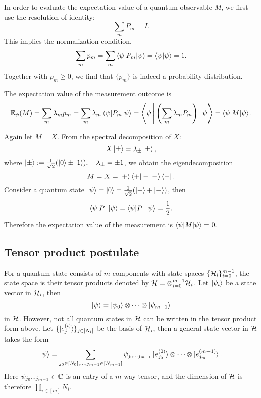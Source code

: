 In order to evaluate the expectation value of a quantum observable $M$, we first use  the resolution of identity: 
\begin{equation}
\sum_{m} P_m=I.
\end{equation}
This implies the normalization condition,
\begin{equation}
\sum_{m} p_m=\sum_{m} \braket{\psi|P_m|\psi}=\braket{\psi|\psi}=1.
\end{equation}
Together with $p_m\ge 0$, we find that $\{p_m\}$ is indeed a probability distribution.


The expectation value of the measurement outcome is
\begin{equation}
\mathbb{E}_{\psi}(M)=\sum_{m} \lambda_m p_m=\sum_{m} \lambda_m \braket{\psi|P_m|\psi}=\Braket{\psi|\left(\sum_{m} \lambda_m P_m \right)|\psi}=\braket{\psi|M|\psi}.
\end{equation}

\begin{exam}
Again let $M=X$. From the spectral decomposition of $X$:
\begin{equation}
X\ket{\pm}=\lambda_{\pm}\ket{\pm},
\end{equation}
where $\ket{\pm}:=\frac{1}{\sqrt{2}}(\ket{0}\pm\ket{1}), \quad \lambda_{\pm}=\pm 1$, we obtain the eigendecomposition
\begin{equation}\label{eqn:X_spectral}
M=X=\ket{+}\bra{+}-\ket{-}\bra{-}.
\end{equation}
Consider a quantum state $\ket{\psi}=\ket{0}=\frac{1}{\sqrt{2}}(\ket{+}+\ket{-})$, then
\begin{equation}
\braket{\psi|P_{+}|\psi}=\braket{\psi|P_{-}|\psi}=\frac12.
\end{equation}
Therefore the expectation value of the measurement is $\braket{\psi|M|\psi}=0.$
\end{exam}

\subsection{Tensor product postulate}

For a quantum state consists of $m$ components with state spaces $\{\mathcal{H}_i\}_{i=0}^{m-1}$, the state space is their tensor products denoted by $\mathcal{H}=\otimes_{i=0}^{m-1} \mathcal{H}_i$. Let $\ket{\psi_i}$ be a state vector in $\mathcal{H}_i$, then 
\begin{equation}
\ket{\psi}=\ket{\psi_0}\otimes\cdots\otimes\ket{\psi_{m-1}}
\end{equation}
in $\mathcal{H}$. However, not all quantum states in $\mathcal{H}$ can be written in the tensor product form above. Let $\{\ket{e^{(i)}_j}\}_{j\in [N_i]}$ be the basis of $\mathcal{H}_i$, then a general state vector in $\mathcal{H}$ takes the form
\begin{equation}
\ket{\psi}=\sum_{j_0\in[N_0],\ldots, j_{m-1}\in [N_{m-1}]} \psi_{j_0\cdots j_{m-1}} \ket{e^{(0)}_{j_0}}\otimes\cdots\otimes \ket{e^{(m-1)}_{j_{m-1}}}.
\label{eqn:tensor_component}
\end{equation}
Here $\psi_{j_0\cdots j_{m-1}}\in\mathbb{C}$ is an entry of a $m$-way tensor, and the dimension of $\mathcal{H}$ is therefore $\prod_{i\in[m]} N_i$.

